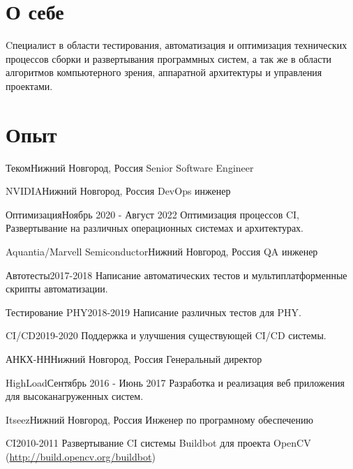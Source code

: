 \documentclass[12pt,a4paper]{moderncv}
\begin{document}
\maketitle

\section{О себе}
Cпециалист в области тестирования, автоматизация и оптимизация технических процессов сборки и развертывания программных систем,
а так же в области алгоритмов компьютерного зрения, аппаратной архитектуры и управления проектами.

\section{Опыт}
    {Теком}{Нижний Новгород, Россия}{}{}
    {Senior Software Engineer}

    {NVIDIA}{Нижний Новгород, Россия}{}{}
    {DevOps инженер}

\cventry{}
    {Оптимизация}{Ноябрь 2020 - Август 2022}{}{}
    {Оптимизация процессов CI, Развертывание на различных операционных системах и архитектурах.}

    {Aquantia/Marvell Semiconductor}{Нижний Новгород, Россия}{}{}
    {QA инженер}

\cventry{}
    {Автотесты}{2017-2018}{}{}
    {Написание автоматических тестов и мультиплатформенные скрипты автоматизации.}

\cventry{}
    {Тестирование PHY}{2018-2019}{}{}
    {Написание различных тестов для PHY.}

\cventry{}
    {CI/CD}{2019-2020}{}{}
    {Поддержка и улучшения существующей CI/CD системы.}

    {АНКХ-НН}{Нижний Новгород, Россия}{}{}
    {Генеральный директор}

\cventry{}
    {HighLoad}{Сентябрь 2016 - Июнь 2017}{}{}
    {Разработка и реализация веб приложения для высоканагруженных систем.}

    {Itseez}{Нижний Новгород, Россия}{}{}
    {Инженер по програмному обеспечению}

\cventry{}
    {CI}{2010-2011}{}{}
    {Развертывание CI системы Buildbot для проекта OpenCV \newline(\url{http://build.opencv.org/buildbot})}
\end{document}
